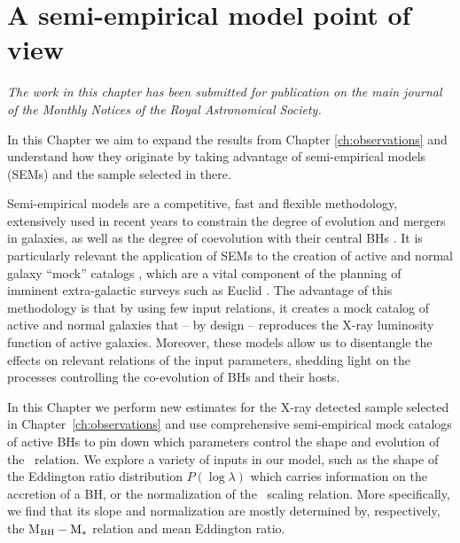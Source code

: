 \chapter{A semi-empirical model point of view} \label{ch:SEM}


\begin{center}
  {\it The work in this chapter has been submitted for publication on the main journal of the Monthly Notices of the Royal Astronomical Society.}
  \vspace{1cm}
\end{center}

In this Chapter we aim to expand the results from Chapter \ref{ch:observations} and understand how they originate by taking advantage of semi-empirical models (SEMs) and the sample selected in there.

Semi-empirical models are a competitive, fast and flexible methodology, extensively used in recent years to constrain the degree of evolution and mergers in galaxies, as well as the degree of coevolution with their central BHs \citep{2013ApJ...762...70C, 2019MNRAS.487..275G, 2019MNRAS.487.2005C, 2020arXiv201002957A, ShankarNat, Allevato21}. 
It is particularly relevant the application of SEMs to the creation of active and normal galaxy ``mock'' catalogs \citep[e.g.][]{2019MNRAS.487..275G, 2019MNRAS.487.2005C, 2020arXiv201002957A, ShankarNat, Allevato21},
which are a vital component of the planning of imminent
extra-galactic surveys such as Euclid \citep[][]{laureijs11}.
The advantage of this methodology is that by using few input relations, 
it creates a mock catalog of active and normal galaxies that – by design – reproduces 
the X-ray luminosity function of active galaxies. 
Moreover, these models allow us to disentangle the effects on 
relevant relations of the input parameters,
shedding light on the processes controlling the co-evolution of BHs and their hosts.

In this Chapter we perform new estimates for the X-ray detected sample selected in Chapter~\ref{ch:observations} and use comprehensive semi-empirical mock 
catalogs of active BHs 
to pin down which parameters control the shape and evolution of the \LXMS\ relation. We explore a variety of inputs in our model, such as the shape of the Eddington ratio distribution $P(\log\lambda)$ which carries information on the accretion of a BH, or the normalization of the \MBHMS\ scaling relation. More specifically, we find that its slope and normalization are mostly determined by, respectively, the M$_{\rm BH}-{\rm M}_*$ relation and mean Eddington ratio.

